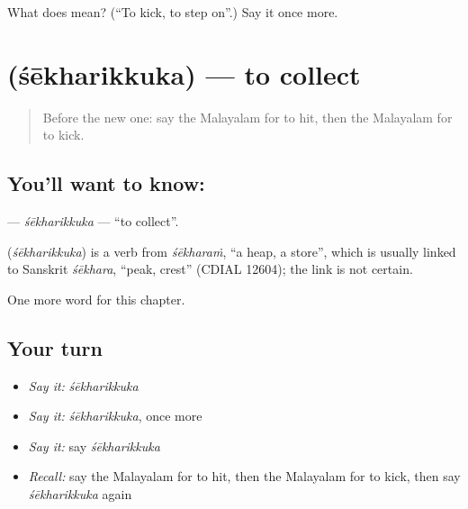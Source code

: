 \begin{tcolorbox}[breakable,colback=teal!4,colframe=teal!35!black,title={Before you move on}]
What does  mean? (\textquotedblleft{}To kick, to step on\textquotedblright{}.) Say it once more.
\end{tcolorbox}
\section[\texorpdfstring{\ml{ശേഖരിക്കുക} (śēkharikkuka)}{ശേഖരിക്കുക (śēkharikkuka)}]{ (śēkharikkuka) — to collect}

\label{lesson:ML-C308-sekharikkuka}



\begin{quote}
Before the new one: say the Malayalam for to hit, then the Malayalam for to kick.
\end{quote}

\subsection*{You'll want to know: }
\textbf{} — \emph{śēkharikkuka} — \textquotedblleft{}to collect\textquotedblright{}.

\begin{cousinweb}
\textbf{} (\emph{śēkharikkuka}) is a verb from \emph{śēkharaṁ}, \textquotedblleft{}a heap, a store\textquotedblright{}, which is usually linked to Sanskrit \emph{śēkhara}, \textquotedblleft{}peak, crest\textquotedblright{} (CDIAL 12604); the link is not certain.
\end{cousinweb}

\begin{grammarlens}[title={What you've built}]
One more word for this chapter.
\end{grammarlens}

\subsection*{Your turn}
\begin{itemize}
\raggedright
  \item \emph{Say it:} \emph{śēkharikkuka}
  \item \emph{Say it:} \emph{śēkharikkuka}, once more
  \item \emph{Say it:} say \emph{śēkharikkuka}
  \item \emph{Recall:} say the Malayalam for to hit, then the Malayalam for to kick, then say \emph{śēkharikkuka} again
\end{itemize}

